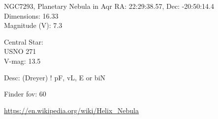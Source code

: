 \begin{block}{NGC7293, Planetary Nebula in Aqr}
    RA: 22:29:38.57, Dec: -20:50:14.4 \\ 
    Dimensions: 16.33 \\ 
    Magnitude (V): 7.3

    Central Star: \\ 
      \hspace{1em}USNO 271 \\ 
      \hspace{1em}V-mag: 13.5 

    Desc: (Dreyer) ! pF, vL, E or biN 

    Finder fov: 60 

    \url{https://en.wikipedia.org/wiki/Helix_Nebula} 
\end{block}